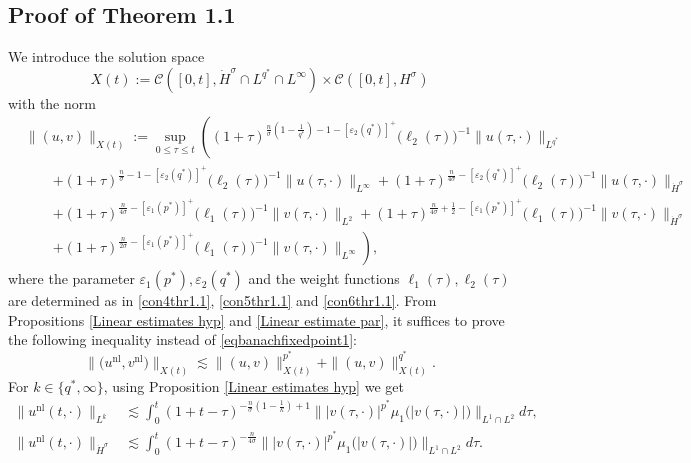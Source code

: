 \documentclass[11pt,reqno]{amsart}
\newcommand{\tron}[1]{\left( #1 \right)}
\numberwithin{equation}{section}
\begin{document}
\subsection{Proof of Theorem 1.1}
We introduce the solution space
$$
X(t):= \mathcal{C}([0, t],\dot{H}^{\sigma}\cap L^{q^*}\cap L^{\infty})\times \mathcal{C}([0,t],H^{\sigma})
$$
with the norm
$$
\begin{aligned}
&\|(u, v)\|_{X(t)}:=\sup _{0 \leq \tau \leq t}\left((1+\tau)^{\frac{n}{\sigma}\tron{1-\frac{1}{q^*}}-1-[\varepsilon_2(q^*)]^{+}}\big(\ell_2(\tau)\big)^{-1}\|u(\tau, \cdot)\|_{L^{q^*}}\right.\\
&\qquad\left.+(1+\tau)^{\frac{n}{\sigma}-1-[\varepsilon_2(q^*)]^{+}}\big(\ell_2(\tau)\big)^{-1}\|u(\tau, \cdot)\|_{L^\infty}+(1+\tau)^{\frac{n}{4\sigma}-[\varepsilon_2(q^*)]^{+}}\big(\ell_2(\tau)\big)^{-1}\|u(\tau, \cdot)\|_{\dot{H}^\sigma}\right.\\
&\qquad\left.+(1+\tau)^{\frac{n}{4\sigma}-[\varepsilon_1(p^*)]^{+}}\big(\ell_1(\tau)\big)^{-1}\|v(\tau, \cdot)\|_{L^2}+(1+\tau)^{\frac{n}{4\sigma}+\frac{1}{2}-[\varepsilon_1(p^*)]^{+}}\big(\ell_1(\tau)\big)^{-1}\|v(\tau, \cdot)\|_{\dot{H}^\sigma}\right.\\
&\qquad\left.+(1+\tau)^{\frac{n}{2\sigma}-[\varepsilon_1(p^*)]^{+}}\big(\ell_1(\tau)\big)^{-1}\|v(\tau,\cdot)\|_{L^{\infty}}\right),
\end{aligned}
$$
where the parameter $\varepsilon_1(p^*),\varepsilon_2(q^*)$ and the weight functions $\ell_1(\tau), \ell_2(\tau)$ are determined as in \eqref{con4thr1.1}, \eqref{con5thr1.1} and \eqref{con6thr1.1}. From Propositions \ref{Linear estimates hyp} and \ref{Linear estimate par}, it suffices to prove the following inequality instead of \eqref{eqbanachfixedpoint1}:
\begin{equation}\label{eq1thr1.1}
\big\|\big(u^{\mathrm{nl}}, v^{\mathrm{nl}}\big)\big\|_{X(t)} \lesssim\|(u, v)\|_{X(t)}^{p^*}+\|(u, v)\|_{X(t)}^{q^*} .
\end{equation}
For $k\in\{q^*,\infty\}$, using Proposition \ref{Linear estimates hyp} we get
\begin{align}
\big\|u^{\mathrm{nl}}(t,\cdot)\big\|_{L^k}&\lesssim \int_0^t(1+t-\tau)^{-\frac{n}{\sigma}\left(1-\frac{1}{k}\right)+1}\big\||v(\tau, \cdot)|^{p^*} \mu_1\big(|v(\tau, \cdot)|\big)\big\|_{L^1\cap L^2} d \tau,\label{eq2thr1.1}\\
\big\|u^{\mathrm{nl}}(t,\cdot)\big\|_{\dot{H}^{\sigma}} &\lesssim \int_0^t(1+t-\tau)^{-\frac{n}{4\sigma}}\big\||v(\tau, \cdot)|^{p^*} \mu_1\big(|v(\tau, \cdot)|\big)\big\|_{L^1\cap L^2} d \tau.\label{eq3thr1.1}
\end{align}
\end{document}
